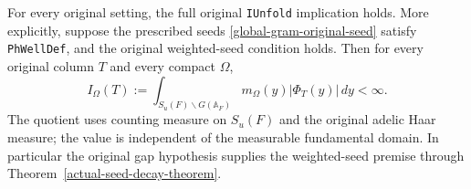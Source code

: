 \begin{theorem}
\label{global-gram-ifinite}
For every original setting, the full original \texttt{IUnfold}
implication holds.  More explicitly, suppose the prescribed seeds
\eqref{global-gram-original-seed} satisfy \texttt{PhWellDef}, and
the original weighted-seed condition holds.  Then for every original
column $T$ and every compact $\Omega$,
\begin{equation}\label{global-gram-ifinite-eq}
 I_\Omega(T):=
 \int_{S_u(F)\backslash G(\mathbb A_F)}
              m_\Omega(y)|\Phi_T(y)|\,dy<\infty.
\end{equation}
The quotient uses counting measure on $S_u(F)$ and the original
adelic Haar measure; the value is independent of the measurable
fundamental domain.  In particular the original gap hypothesis
supplies the weighted-seed premise through
Theorem~\ref{actual-seed-decay-theorem}.
\end{theorem}

